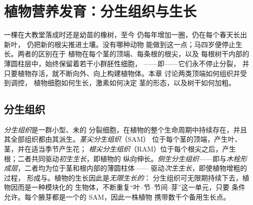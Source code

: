 \chapter{植物营养发育：分生组织与生长}\label{ch:b2:plant-meristems}

一棵在大教堂落成时还是幼苗的橡树，至今
仍每年增加一圈，仍在每个春天长出新叶，
仍把新的根尖推进土壤。没有哪种动物
能做到这一点；马四岁便停止生长。两者的区别在于
植物在每个茎的顶端、每条根的根尖，以及
每根树干内部的薄圆柱层中，始终保留着若干小群胚性细胞，
——即\emph{}——它们永不停止分裂，
并只要植物存活，就不断向外、向上构建植物体。本章
讨论两类顶端如何组织并受到调控，
植物细胞如何生长，激素如何决定
茎的形态，以及树干如何加粗。

\section{分生组织}

\begin{definition}[分生组织与两类生长]\label{def:b2:plant-meristems:meristem}
\emph{分生组织}是一群小型、未的
分裂细胞，在植物的整个生命周期中持续存在，并且
其全部组织都由其派生。\emph{茎尖分生组织}（SAM）
位于每个茎的顶端，产生叶、茎，并在适当季节产生花；
\emph{根尖分生组织}（RAM）位于每个根尖之后，产生
根；二者共同驱动\emph{初生生长}，即植物的
纵向伸长。\emph{侧生分生组织}——即\emph{}与\emph{木栓形成层}，二者均为位于茎和根内部的薄圆柱体——
驱动\emph{次生生长}，即使植物增粗的过程，
形成与。植物的生长因此是\emph{无限生长的}：
分生组织可无限期持续下去，植物因而是一种模块化的
生物体，不断重复“叶–节–节间–芽”这一单元，只要
条件允许。每个腋芽都是一个的 SAM，因此一株植物
携带数千个备用生长点。
\end{definition}

